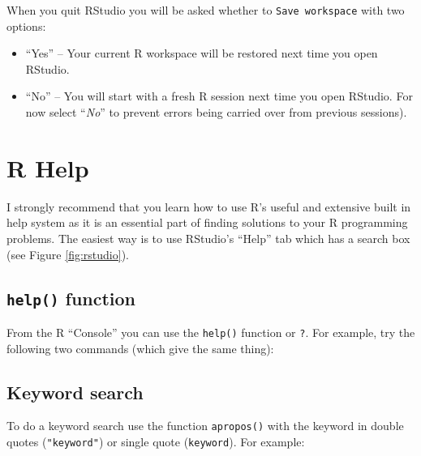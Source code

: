 \documentclass[a4paper,9pt,twocolumn,twoside,printwatermark=false]{pinp}
\providecommand{\tightlist}{%
  \setlength{\itemsep}{0pt}\setlength{\parskip}{0pt}}
\begin{document}
When you quit RStudio you will be asked whether to
\texttt{Save\ workspace} with two options:

\begin{itemize}
\tightlist
\item
  ``Yes'' -- Your current R workspace will be restored next time you
  open RStudio.
\item
  ``No'' -- You will start with a fresh R session next time you open
  RStudio. For now select ``\emph{No}'' to prevent errors being carried
  over from previous sessions).
\end{itemize}

\section{R Help}\label{r-help}

I strongly recommend that you learn how to use R's useful and extensive
built in help system as it is an essential part of finding solutions to
your R programming problems. The easiest way is to use RStudio's
``Help'' tab which has a search box (see Figure \ref{fig:rstudio}).

\subsection{\texorpdfstring{\texttt{help()}
function}{help() function}}\label{help-function}

From the R ``Console'' you can use the \texttt{help()} function or
\texttt{?}. For example, try the following two commands (which give the
same thing):

\begin{Shaded}
\begin{Highlighting}[]
\end{Highlighting}
\end{Shaded}

\subsection{Keyword search}\label{keyword-search}

To do a keyword search use the function \texttt{apropos()} with the
keyword in double quotes (\texttt{"keyword"}) or single quote
(\texttt{\textquotesingle{}keyword\textquotesingle{}}). For example:

\begin{Shaded}
\begin{Highlighting}[]
\NormalTok{(}\NormalTok{)}
\end{Highlighting}
\end{Shaded}
\end{document}
